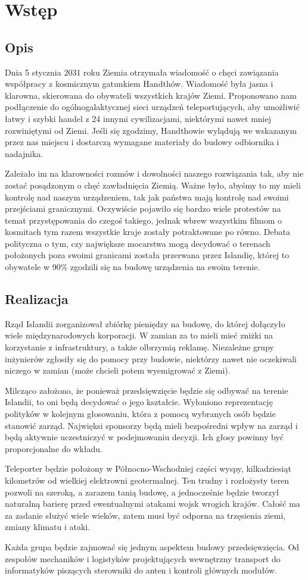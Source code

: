 \section{Wstęp}
\subsection{Opis}
Dnia 5 stycznia 2031 roku Ziemia otrzymała wiadomość o chęci zawiązania współpracy z kosmicznym gatunkiem Handthów.
Wiadomość była jasna i klarowna, skierowana do obywateli wszystkich krajów Ziemi.
Proponowano nam podłączenie do ogólnogalaktycznej sieci urządzeń teleportujących, aby umożliwić łatwy i szybki handel z 24 innymi cywilizacjami, niektórymi nawet mniej rozwiniętymi od Ziemi.
Jeśli się zgodzimy, Handthowie wylądują we wskazanym przez nas miejscu i dostarczą wymagane materiały do budowy odbiornika i nadajnika.

Zależało im na klarowności rozmów i dowolności naszego rozwiązania tak, aby nie zostać posądzonym o chęć zawładnięcia Ziemią.
Ważne było, abyśmy to my mieli kontrolę nad naszym urządzeniem, tak jak państwa mają kontrolę nad swoimi przejściami granicznymi.
Oczywiście pojawiło się bardzo wiele protestów na temat przystępowania do czegoś takiego, jednak wbrew wszystkim filmom o kosmitach tym razem wszystkie kraje zostały potraktowane po równo.
Debata polityczna o tym, czy największe mocarstwa mogą decydować o terenach położonych poza swoimi granicami została przerwana przez Islandię, której to obywatele w 90\% zgodzili się na budowę urządzenia na swoim terenie.

\subsection{Realizacja}
Rząd Islandii zorganizował zbiórkę pieniędzy na budowę, do której dołączyło wiele międzynarodowych korporacji.
W zamian za to mieli mieć zniżki na korzystanie z infrastruktury, a także olbrzymią reklamę.
Niezależne grupy inżynierów zgłosiły się do pomocy przy budowie, niektórzy nawet nie oczekiwali niczego w zamian (może chcieli potem wyemigrować z Ziemi).

Milcząco założono, że ponieważ przedsięwzięcie będzie się odbywać na terenie Islandii, to oni będą decydować o jego kształcie.
Wyłoniono reprezentację polityków w kolejnym głosowaniu, która z pomocą wybranych osób będzie stanowić zarząd.
Najwięksi sponsorzy będą mieli bezpośredni wpływ na zarząd i będą aktywnie uczestniczyć w podejmowaniu decyzji.
Ich głosy powinny być proporcjonalne do wkładu.

Teleporter będzie położony w Północno-Wschodniej części wyspy, kilkadziesiąt kilometrów od wielkiej elektrowni geotermalnej.
Ten trudny i rozłożysty teren pozwoli na szeroką, a zarazem tanią budowę, a jednocześnie będzie tworzył naturalną barierę przed ewentualnymi atakami wojsk wrogich krajów.
Całość ma za zadanie służyć wiele wieków, zatem musi być odporna na trzęsienia ziemi, zmiany klimatu i ataki.

Każda grupa będzie zajmować się jednym aspektem budowy przedsięwzięcia.
Od zespołów mechaników i logistyków projektujących wewnętrzny transport do informatyków piszących sterowniki do anten i kontroli głównych modułów.
